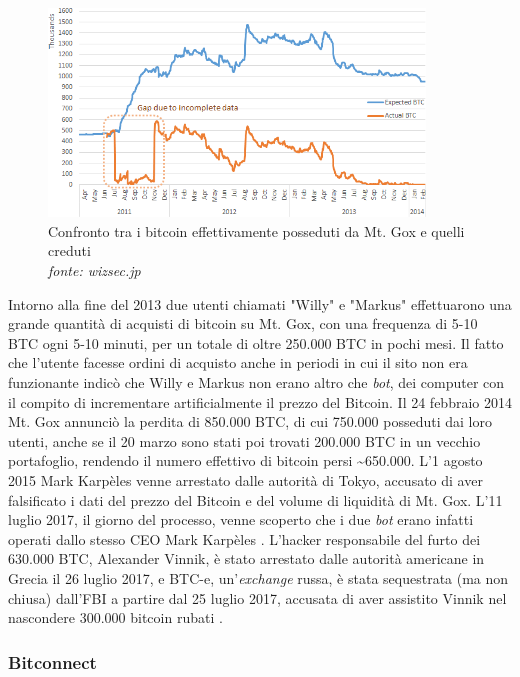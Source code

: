 \documentclass {article}
\begin{document}
\vspace {0.5cm}
\begin{figure}[htb!]
\includegraphics [width = 10cm] {mtgox.png}
\centering
\captionsetup{width=1.4\linewidth}
\caption {Confronto tra i bitcoin effettivamente posseduti da Mt. Gox e quelli creduti\\\textit{fonte: wizsec.jp}}
\end{figure}
\vspace {0.2cm}
\noindent
%
Intorno alla fine del 2013 due utenti chiamati "Willy" e "Markus" effettuarono una grande quantità di acquisti di bitcoin su Mt. Gox, con una frequenza di 5-10 BTC ogni 5-10 minuti, per un totale di oltre 250.000 BTC in pochi mesi.
Il fatto che l'utente facesse ordini di acquisto anche in periodi in cui il sito non era funzionante indicò che Willy e Markus non erano altro che \textit{bot}, dei computer con il compito di incrementare artificialmente il prezzo del Bitcoin.
Il 24 febbraio 2014 Mt. Gox annunciò la perdita di 850.000 BTC, di cui 750.000 posseduti dai loro utenti, anche se il 20 marzo sono stati poi trovati 200.000 BTC in un vecchio portafoglio, rendendo il numero effettivo di bitcoin persi \textasciitilde 650.000.
L'1 agosto 2015 Mark Karpèles venne arrestato dalle autorità di Tokyo, accusato di aver falsificato i dati del prezzo del Bitcoin e del volume di liquidità di Mt. Gox.
L'11 luglio 2017, il giorno del processo, venne scoperto che i due \textit{bot} erano infatti operati dallo stesso CEO Mark Karpèles \cite{karpelesbot}.
L'hacker responsabile del furto dei 630.000 BTC, Alexander Vinnik, è stato arrestato dalle autorità americane in Grecia il 26 luglio 2017, e BTC-e, un'\textit{exchange} russa, è stata sequestrata (ma non chiusa) dall'FBI a partire dal 25 luglio 2017, accusata di aver assistito Vinnik nel nascondere 300.000 bitcoin rubati \cite{mtgox}.


\subsubsection {Bitconnect}
\end{document}
